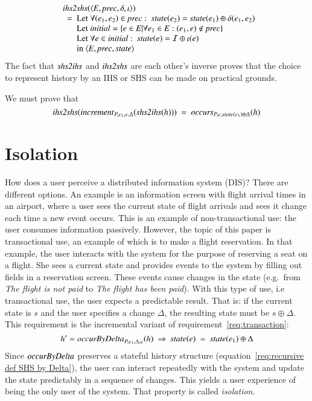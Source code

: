 \documentclass{elsarticle}
\def\id#1{\text{\it #1\/}}
\def\Events{{\mathit E}}
\begin{document}
\begin{eqnarray}
&&\begin{array}{l}
	\id{ihs2shs}(\la\Events, \id{prec}, \delta, \iota\ra)\\
	\ \ =\ \begin{array}[t]{@{}l}
		\text{Let }\forall(e_1,e_2)\in\id{prec}:\ \id{state}(e_2)=\id{state}(e_1)\oplus\delta(e_1,e_2)\\
		\text{Let }\id{initial}=\{e\in\Events|\forall e_1\in\Events: (e_1,e)\notin\id{prec}\}\\
		\text{Let }\forall e\in\id{initial}:\ \id{state}(e)=\mathcal I\oplus\iota(e)\\
		\text{in }\la\Events, \id{prec}, \id{state}\ra
		\end{array}
\end{array}
\label{req:ihs2shs}
\end{eqnarray}
	The fact that $\id{shs2ihs}$ and $\id{ihs2shs}$ are each other's inverse proves that the choice to represent
	history by an IHS or SHS can be made on practical grounds.

	We must prove that
\begin{equation}
	\id{ihs2shs}(\id{increment}_{P,e_1,e,\Delta}(\id{shs2ihs}(h)))\ =\ \id{occurs}_{P,e,\id{state}(e_1)\oplus\Delta}(h)
\end{equation}

\section{Isolation}
\label{sct:Isolation}
	How does a user perceive a distributed information system (DIS)?
	There are different options.
	An example is an information screen with flight arrival times in an airport,
	where a user sees the current state of flight arrivals and sees it change each time a new event occurs.
	This is an example of non-transactional use: the user consumes information passively.
	However, the topic of this paper is transactional use,
	an example of which is to make a flight reservation.
	In that example, the user interacts with the system for the purpose of reserving a seat on a flight.
	She sees a current state and provides events to the system by filling out fields in a reservation screen.
	These events cause changes in the state (e.g.\ from {\em The flight is not paid} to {\em The flight has been paid}).
	With this type of use, i.e transactional use, the user expects a predictable result.
	That is: if the current state is $s$ and the user specifies a change $\Delta$,
	the resulting state must be $s\oplus\Delta$.
	This requirement is the incremental variant of requirement~\ref{req:transaction}:
\begin{equation}
	h'=\id{occurByDelta}_{P,e_1,\Delta,e}(h)\ \Rightarrow\ \id{state}(e)\ =\ \id{state}(e_1)\oplus\Delta
\label{req:occurByDelta}
\end{equation}
	Since $\id{occurByDelta}$ preserves a stateful history structure (equation~\ref{req:recursive def SHS by Delta}),
	the user can interact repeatedly with the system and update the state predictably in a sequence of changes.
	This yields a user experience of being the only user of the system.
	That property is called {\em isolation}.
\end{document}

